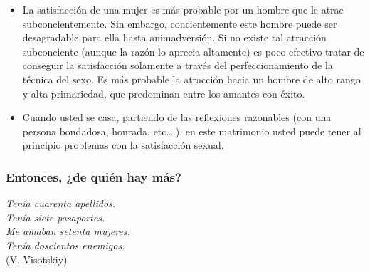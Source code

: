 \begin{itemize}

\item
  La satisfacción de una mujer es más probable por un hombre que le
  atrae subconcientemente. Sin embargo, concientemente este hombre puede
  ser desagradable para ella hasta animadversión. Si no existe tal
  atracción subconciente (aunque la razón lo aprecia altamente) es poco
  efectivo tratar de conseguir la satisfacción solamente a través del
  perfeccionamiento de la técnica del sexo. Es más probable la atracción
  hacia un hombre de alto rango y alta primariedad, que predominan entre
  los amantes con éxito.
\item
  Cuando usted se casa, partiendo de las reflexiones razonables (con una
  persona bondadosa, honrada, etc\ldots{}.), en este matrimonio usted
  puede tener al principio problemas con la satisfacción sexual.
\end{itemize}

\protect\hypertarget{M15}{}{}

\subsubsection{Entonces, ¿de quién hay más?}\label{entonces-de-quiuxe9n-hay-muxe1s}

\noindent
\emph{
Tenía cuarenta apellidos.\\
Tenía siete pasaportes.\\
Me amaban setenta mujeres.\\
Tenía doscientos enemigos.}\\
(V. Visotskiy)\\



